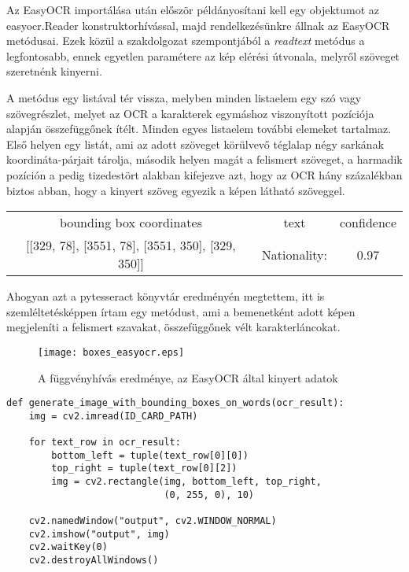 \documentclass[12pt]{report}
\begin{document}
Az EasyOCR importálása után először példányosítani kell egy objektumot az easyocr.Reader konstruktorhívással, majd rendelkezésünkre állnak az EasyOCR metódusai. Ezek közül a szakdolgozat szempontjából a \textit{readtext} metódus a legfontosabb, ennek egyetlen paramétere az kép elérési útvonala, melyről szöveget szeretnénk kinyerni.

A metódus egy listával tér vissza, melyben minden listaelem egy szó vagy szövegrészlet, melyet az OCR a karakterek egymáshoz viszonyított pozíciója alapján összefüggőnek ítélt. Minden egyes listaelem további elemeket tartalmaz. Első helyen egy listát, ami az adott szöveget körülvevő téglalap négy sarkának koordináta-párjait tárolja, második helyen magát a felismert szöveget, a harmadik pozíción a pedig tizedestört alakban kifejezve azt, hogy az OCR hány százalékban biztos abban, hogy a kinyert szöveg egyezik a képen látható szöveggel.

\begin{tcolorbox}
    \begin{center}
        \begin{tabular}{ c c c }
         bounding box coordinates & text & confidence \\ 
         {[}{[}329, 78{]}, {[}3551, 78{]}, {[}3551, 350{]}, {[}329, 350{]}{]} & Nationality: & 0.97 \\
        \end{tabular}
    \end{center}
\end{tcolorbox}

Ahogyan azt a pytesseract könyvtár eredményén megtettem, itt is szemléltetésképpen írtam egy metódust, ami a bemenetként adott képen megjeleníti a felismert szavakat, összefüggőnek vélt karakterláncokat.

\pagebreak

\begin{figure}[h]
    \centerline{\texttt{[image: boxes\_easyocr.eps]}}
    \caption{A függvényhívás eredménye, az EasyOCR által kinyert adatok}
\end{figure}

\begin{verbatim}
def generate_image_with_bounding_boxes_on_words(ocr_result):
    img = cv2.imread(ID_CARD_PATH)

    for text_row in ocr_result:
        bottom_left = tuple(text_row[0][0])
        top_right = tuple(text_row[0][2])
        img = cv2.rectangle(img, bottom_left, top_right, 
                            (0, 255, 0), 10)

    cv2.namedWindow("output", cv2.WINDOW_NORMAL)
    cv2.imshow("output", img)
    cv2.waitKey(0)
    cv2.destroyAllWindows()
\end{verbatim}
\end{document}
